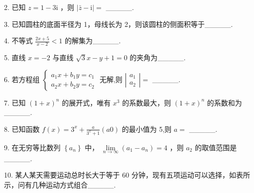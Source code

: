 \documentclass[10pt]{article}
\begin{document}
2. 已知 \(z = 1 - 3\mathrm{i}\) ，则 \(\left| {\bar{z} - \mathrm{i}}\right|  =\) \_\_\_\_\_.

3. 已知圆柱的底面半径为 1，母线长为 2，则该圆柱的侧面积等于\_\_\_\_\_.

4. 不等式 \(\frac{{2x} + 5}{x - 2} < 1\) 的解集为\_\_\_\_\_.

5. 直线 \(x =  - 2\) 与直线 \(\sqrt{3}x - y + 1 = 0\) 的夹角为\_\_\_\_\_.

6. 若方程组 \(\left\{  \begin{array}{l} {a}_{1}x + {b}_{1}y = {c}_{1} \\  {a}_{2}x + {b}_{2}y = {c}_{2} \end{array}\right.\) 无解,则 \(\left| \begin{array}{l} {a}_{1} \\  {a}_{2} \end{array}\right|  =\) \_\_\_\_\_.

7. 已知 \({\left( 1 + x\right) }^{n}\) 的展开式，唯有 \({x}^{3}\) 的系数最大，则 \({\left( 1 + x\right) }^{n}\) 的系数和为\_\_\_\_\_.

8. 已知函数 \(f\left( x\right)  = {3}^{x} + \frac{a}{{3}^{x} + 1}\left( {a0}\right)\) 的最小值为 5,则 \(a =\) \_\_\_\_\_.

9. 在无穷等比数列 \(\left\{  {a}_{n}\right\}\) 中， \(\mathop{\lim }\limits_{{n \rightarrow  \infty }}\left( {{a}_{1} - {a}_{n}}\right)  = 4\) ，则 \({a}_{2}\) 的取值范围是\_\_\_\_\_.

10. 某人某天需要运动总时长大于等于 60 分钟，现有五项运动可以选择，如表所示，问有几种运动方式组合\_\_\_\_\_.

\begin{center}
\end{center}
\end{document}
